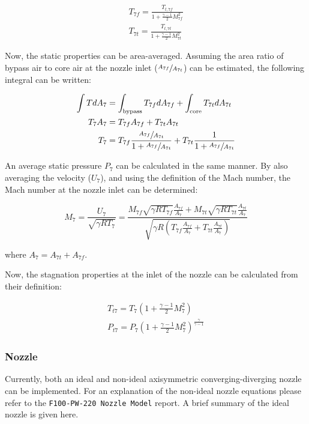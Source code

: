 \documentclass{article}
\begin{document}
\begin{gather*}
T_{7f} = \frac{T_{t,7f}}{1 + \frac{\gamma - 1}{2} M_{7f}^2} \\
T_{7t} = \frac{T_{t,7t}}{1 + \frac{\gamma - 1}{2} M_{7t}^2}
\end{gather*}

Now, the static properties can be area-averaged. Assuming the area ratio of bypass air to core air at the nozzle inlet ($\sfrac{A_{7f}}{A_{7t}}$) can be estimated, the following integral can be written:

\begin{equation}
\label{eq:T7_integral}
\begin{split}
\int T dA_7 & = \int_{\textrm{bypass}}  T_{7f} dA_{7f} + \int_{\textrm{core}} T_{7t} dA_{7t} \\
T_7 A_7 & = T_{7f} A_{7f} +T_{7t} A_{7t} \\
T_7 & = T_{7f} \frac{\sfrac{A_{7f}}{A_{7t}}}{1 + \sfrac{A_{7f}}{A_{7t}}} +T_{7t} \frac{1}{1 + \sfrac{A_{7f}}{A_{7t}}}
\end{split}
\end{equation}

An average static pressure $P_7$ can be calculated in the same manner. By also averaging the velocity ($U_7$), and using the definition of the Mach number, the Mach number at the nozzle inlet can be determined:

\begin{equation}
M_7 = \frac{U_7}{\sqrt{\gamma R T_7}} = 
\frac{ M_{7f} \sqrt{\gamma R T_{7f}} \frac{A_{7f}}{A_7}  + M_{7t} \sqrt{\gamma R T_{7t}} \frac{A_{7t}}{A_7} } 
{ \sqrt{\gamma R \left( T_{7f} \frac{A_{7f}}{A_7} + T_{7t} \frac{A_{7t}}{A_7} \right)}}
\end{equation}

where $A_7 = A_{7t} + A_{7f}$. 

Now, the stagnation properties at the inlet of the nozzle can be calculated from their definition:

\begin{gather}
T_{t7} = T_7 \left( 1 + \frac{\gamma - 1}{2} M_7^2 \right) \\
P_{t7} = P_7 \left( 1 + \frac{\gamma - 1}{2} M_7^2 \right)^{\frac{\gamma}{\gamma - 1}} 
\end{gather}

\subsubsection{Nozzle}

Currently, both an ideal and non-ideal axisymmetric converging-diverging nozzle can be implemented. For an explanation of the non-ideal nozzle equations please refer to the \texttt{F100-PW-220 Nozzle Model} report. A brief summary of the ideal nozzle is given here. 
\end{document}
